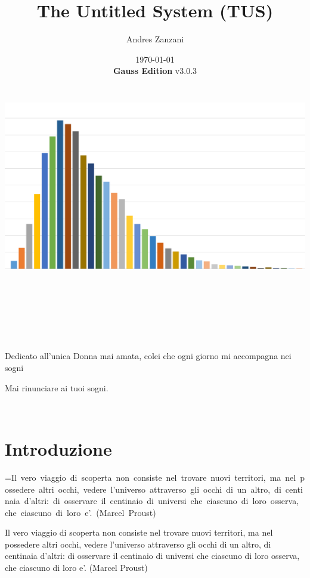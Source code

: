 \documentclass[a4paper,11pt,twoside,openany]{book}
\makeatletter
\newcommand{\mybox}[1]{%
	\setbox0=\hbox{#1}%
	\setlength{\@tempdima}{\dimexpr\wd0+13pt}%
	\begin{tcolorbox}[boxrule=0.5pt,arc=4pt, breakable,enhanced,
		left=6pt,right=6pt,top=6pt,bottom=6pt,boxsep=0pt,width=\@tempdima]
		#1
	\end{tcolorbox}
}
\makeatother
\begin{document}
\title{The Untitled System (TUS)}
\date{\today\\\textbf{Gauss Edition} v3.0.3\\\includegraphics[width=6.85139in,height=3.79514in]{copertina.png}}
\author{Andres Zanzani}
\maketitle
\thispagestyle{empty}

\newpage~\newpage~




Dedicato all'unica Donna mai amata, colei che ogni giorno mi accompagna nei sogni

Mai rinunciare ai tuoi sogni.
\thispagestyle{empty}

\newpage~\thispagestyle{empty}%

\setcounter{page}{0}

\begin{multicols}{2}
\tableofcontents{}
\end{multicols}

\pagebreak{}

\section{Introduzione}

\pagestyle{plain}

\mybox{Il vero viaggio di scoperta non consiste nel trovare nuovi territori, ma nel possedere altri occhi, vedere l'universo attraverso gli occhi di un altro, di centinaia d'altri: di osservare il centinaio di universi che ciascuno di loro osserva, che ciascuno di loro e'. (Marcel Proust)}\medskip
\end{document}
